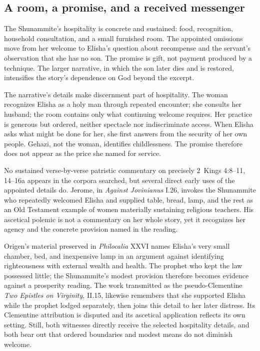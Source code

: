 \subsection*{A room, a promise, and a received messenger\enspace{}}

The Shunammite's hospitality is concrete and sustained: food, recognition, household consultation, and a small furnished room. The appointed omissions move from her welcome to Elisha's question about recompense and the servant's observation that she has no son. The promise is gift, not payment produced by a technique. The larger narrative, in which the son later dies and is restored, intensifies the story's dependence on God beyond the excerpt.

The narrative's details make discernment part of hospitality. The woman recognizes Elisha as a holy man through repeated encounter; she consults her husband; the room contains only what continuing welcome requires. Her practice is generous but ordered, neither spectacle nor indiscriminate access. When Elisha asks what might be done for her, she first answers from the security of her own people. Gehazi, not the woman, identifies childlessness. The promise therefore does not appear as the price she named for service.

No sustained verse-by-verse patristic commentary on precisely 2~Kings 4:8--11, 14--16a appears in the corpora searched, but several direct early uses of the appointed details do. Jerome, in \emph{Against Jovinianus} I.26, invokes the Shunammite who repeatedly welcomed Elisha and supplied table, bread, lamp, and the rest as an Old Testament example of women materially sustaining religious teachers. His ascetical polemic is not a commentary on her whole story, yet it recognizes her agency and the concrete provision named in the reading.

Origen's material preserved in \emph{Philocalia} XXVI names Elisha's very small chamber, bed, and inexpensive lamp in an argument against identifying righteousness with external wealth and health. The prophet who kept the law possessed little; the Shunammite's modest provision therefore becomes evidence against a prosperity reading. The work transmitted as the pseudo-Clementine \emph{Two Epistles on Virginity}, II.15, likewise remembers that she supported Elisha while the prophet lodged separately, then joins this detail to her later distress. Its Clementine attribution is disputed and its ascetical application reflects its own setting. Still, both witnesses directly receive the selected hospitality details, and both bear out that ordered boundaries and modest means do not diminish welcome.

